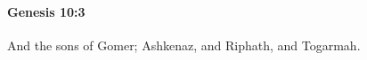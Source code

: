 
		\paragraph{Genesis 10:3} %
			\label{GENESIS-10-3}

			And the sons of Gomer; Ashkenaz, and Riphath, and Togarmah.


